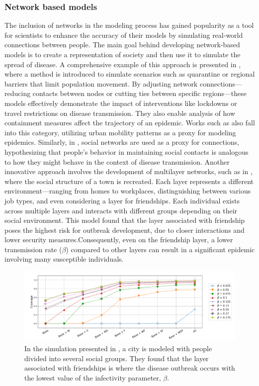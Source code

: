 \subsubsection{Network based models}
The inclusion of networks in the modeling process has gained popularity as a tool for scientists to enhance the accuracy of their models by simulating real-world connections between people. The main goal behind developing network-based models is to create a representation of society and then use it to simulate the spread of disease. A comprehensive example of this approach is presented in \cite{VanMieghem2009}, where a method is introduced to simulate scenarios such as quarantine or regional barriers that limit population movement. By adjusting network connections—reducing contacts between nodes or cutting ties between specific regions—these models effectively demonstrate the impact of interventions like lockdowns or travel restrictions on disease transmission. They also enable analysis of how containment measures affect the trajectory of an epidemic.
Works such as \cite{Tizzoni2014} also fall into this category, utilizing urban mobility patterns as a proxy for modeling epidemics. Similarly, in \cite{Carballosa_2021}, social networks are used as a proxy for connections, hypothesizing that people's behavior in maintaining social contacts is analogous to how they might behave in the context of disease transmission.
Another innovative approach involves the development of multilayer networks, such as in \cite{Turker_2023}, where the social structure of a town is recreated. Each layer represents a different environment—ranging from homes to workplaces, distinguishing between various job types, and even considering a layer for friendships. Each individual exists across multiple layers and interacts with different groups depending on their social environment. This model found that the layer associated with friendship poses the highest risk for outbreak development, due to closer interactions and lower security measures.Consequently, even on the friendship layer, a lower transmission rate ($\beta$) compared to other layers can result in a significant epidemic involving many susceptible individuals.
\begin{figure}[h]
	\centering
	\includegraphics[width=0.9\linewidth]{0_introduction/images_review/turker_city_recreated}
	\caption[Simulation of disease spreading within a city]{In the simulation presented in \cite{Turker_2023}, a city is modeled with people divided into several social groups. They found that the layer associated with friendships is where the disease outbreak occurs with the lowest value of the infectivity parameter, $\beta$.}
	\label{fig:turkercityrecreated}
\end{figure}
